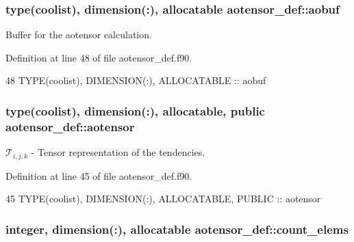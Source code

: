 \subsubsection[{\texorpdfstring{aobuf}{aobuf}}]{\setlength{\rightskip}{0pt plus 5cm}type({\bf coolist}), dimension(\+:), allocatable aotensor\+\_\+def\+::aobuf\hspace{0.3cm}{\ttfamily [private]}}\hypertarget{namespaceaotensor__def_ac1bc60299b01412e33c173869cb08307}{}\label{namespaceaotensor__def_ac1bc60299b01412e33c173869cb08307}


Buffer for the aotensor calculation. 



Definition at line 48 of file aotensor\+\_\+def.\+f90.


\begin{DoxyCode}
48   \textcolor{keywordtype}{TYPE}(coolist), \textcolor{keywordtype}{DIMENSION(:)}, \textcolor{keywordtype}{ALLOCATABLE} :: aobuf
\end{DoxyCode}
\subsubsection[{\texorpdfstring{aotensor}{aotensor}}]{\setlength{\rightskip}{0pt plus 5cm}type({\bf coolist}), dimension(\+:), allocatable, public aotensor\+\_\+def\+::aotensor}\hypertarget{namespaceaotensor__def_a0dc43bc9294a18f2fe57b67489f1702f}{}\label{namespaceaotensor__def_a0dc43bc9294a18f2fe57b67489f1702f}


$\mathcal{T}_{i,j,k}$ -\/ Tensor representation of the tendencies. 



Definition at line 45 of file aotensor\+\_\+def.\+f90.


\begin{DoxyCode}
45   \textcolor{keywordtype}{TYPE}(coolist), \textcolor{keywordtype}{DIMENSION(:)}, \textcolor{keywordtype}{ALLOCATABLE}, \textcolor{keywordtype}{PUBLIC} :: aotensor
\end{DoxyCode}
\subsubsection[{\texorpdfstring{count\+\_\+elems}{count_elems}}]{\setlength{\rightskip}{0pt plus 5cm}integer, dimension(\+:), allocatable aotensor\+\_\+def\+::count\+\_\+elems\hspace{0.3cm}{\ttfamily [private]}}\hypertarget{namespaceaotensor__def_aa9e30c84efc5a81409ba9c0286c87eac}{}\label{namespaceaotensor__def_aa9e30c84efc5a81409ba9c0286c87eac}


